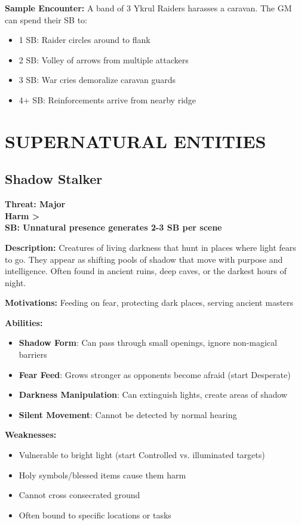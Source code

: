 \documentclass[12pt]{article}
\newcommand{\cp}[1]{\textbf{SB: #1}}
\newcommand{\harm}[1]{\textbf{Harm #1}}
\newcommand{\threat}[1]{\textbf{Threat: #1}}
\begin{document}
\textbf{Sample Encounter:}
A band of 3 Ykrul Raiders harasses a caravan. The GM can spend their SB to:
\begin{itemize}
\item 1 SB: Raider circles around to flank
\item 2 SB: Volley of arrows from multiple attackers
\item 3 SB: War cries demoralize caravan guards
\item 4+ SB: Reinforcements arrive from nearby ridge
\end{itemize}

\section{SUPERNATURAL ENTITIES}

\subsection*{Shadow Stalker}

\threat{Major} \\
\harm{>} \\
\cp{Unnatural presence generates 2-3 SB per scene}

\vspace{0.5em}
\textbf{Description:} Creatures of living darkness that hunt in places where light fears to go. They appear as shifting pools of shadow that move with purpose and intelligence. Often found in ancient ruins, deep caves, or the darkest hours of night.

\textbf{Motivations:} Feeding on fear, protecting dark places, serving ancient masters

\textbf{Abilities:}
\begin{itemize}
\item \textbf{Shadow Form}: Can pass through small openings, ignore non-magical barriers
\item \textbf{Fear Feed}: Grows stronger as opponents become afraid (start Desperate)
\item \textbf{Darkness Manipulation}: Can extinguish lights, create areas of shadow
\item \textbf{Silent Movement}: Cannot be detected by normal hearing
\end{itemize}

\textbf{Weaknesses:}
\begin{itemize}
\item Vulnerable to bright light (start Controlled vs. illuminated targets)
\item Holy symbols/blessed items cause them harm
\item Cannot cross consecrated ground
\item Often bound to specific locations or tasks
\end{itemize}
\end{document}
